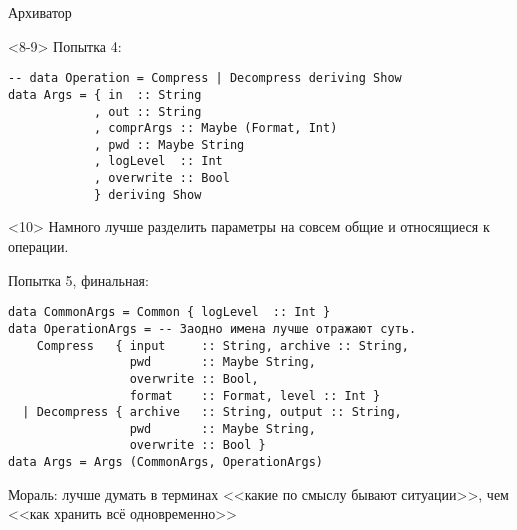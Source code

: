 \begin{frame}[t,fragile]{Архиватор}
\begin{onlyenv}<8-9>
Попытка 4:
\begin{verbatim}
-- data Operation = Compress | Decompress deriving Show
data Args = { in  :: String
            , out :: String
            , comprArgs :: Maybe (Format, Int)
            , pwd :: Maybe String
            , logLevel  :: Int
            , overwrite :: Bool
            } deriving Show
\end{verbatim}
\end{onlyenv}

\begin{onlyenv}<10>
Намного лучше разделить параметры на совсем общие и относящиеся к операции.

Попытка 5, финальная:
\begin{verbatim}
data CommonArgs = Common { logLevel  :: Int }
data OperationArgs = -- Заодно имена лучше отражают суть.
    Compress   { input     :: String, archive :: String,
                 pwd       :: Maybe String,
                 overwrite :: Bool,
                 format    :: Format, level :: Int }
  | Decompress { archive   :: String, output :: String,
                 pwd       :: Maybe String,
                 overwrite :: Bool }
data Args = Args (CommonArgs, OperationArgs)
\end{verbatim}
Мораль: лучше думать в терминах <<какие по смыслу бывают ситуации>>, чем
<<как хранить всё одновременно>>
\end{onlyenv}
\end{frame}

